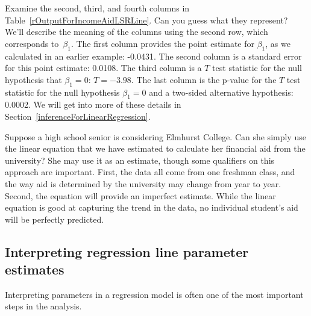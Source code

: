\begin{example}{Examine the second, third, and fourth columns in Table~\ref{rOutputForIncomeAidLSRLine}. Can you guess what they represent?}
We'll describe the meaning of the columns using the second row, which corresponds to~$\beta_1$. The first column provides the point estimate for $\beta_1$, as we calculated in an earlier example: -0.0431. The second column is a standard error for this point estimate: 0.0108. The third column is a $T$ test statistic for the null hypothesis that $\beta_1 = 0$: $T=-3.98$. The last column is the p-value for the $T$ test statistic for the null hypothesis $\beta_1=0$ and a two-sided alternative hypothesis: 0.0002. We will get into more of these details in Section~\ref{inferenceForLinearRegression}.
\end{example}

\begin{example}{Suppose a high school senior is considering Elmhurst College. Can she simply use the linear equation that we have estimated to calculate her financial aid from the university?}
She may use it as an estimate, though some qualifiers on this approach are important. First, the data all come from one freshman class, and the way aid is determined by the university may change from year to year. Second, the equation will provide an imperfect estimate. While the linear equation is good at capturing the trend in the data, no individual student's aid will be perfectly predicted.
\end{example} 

\subsection{Interpreting regression line parameter estimates}


Interpreting parameters in a regression model is often one of the most important steps in the analysis.


